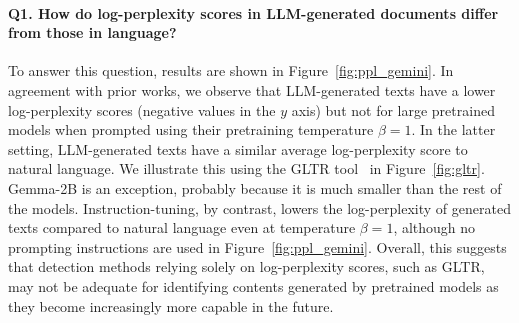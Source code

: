 \paragraph{Q1. How do log-perplexity scores in LLM-generated documents differ from those in language?}
To answer this question, results are shown in Figure~\ref{fig:ppl_gemini}. In agreement with prior works, we observe that LLM-generated texts have a lower log-perplexity scores (negative values in the $y$ axis) but {not for large pretrained models when prompted using their pretraining temperature $\beta=1$.} In the latter setting, LLM-generated texts have a similar average log-perplexity score to natural language. We illustrate this using the GLTR tool~\citep{gehrmann-etal-2019-gltr} in Figure~\ref{fig:gltr}. Gemma-2B is an exception, probably because it is much smaller than the rest of the models. Instruction-tuning, by contrast, lowers the log-perplexity of generated texts compared to natural language even at temperature $\beta=1$, although no prompting instructions are used in Figure~\ref{fig:ppl_gemini}. Overall, this suggests that detection methods relying solely on log-perplexity scores, such as GLTR, may not be adequate for identifying contents generated by pretrained models as they become increasingly more capable in the future.

